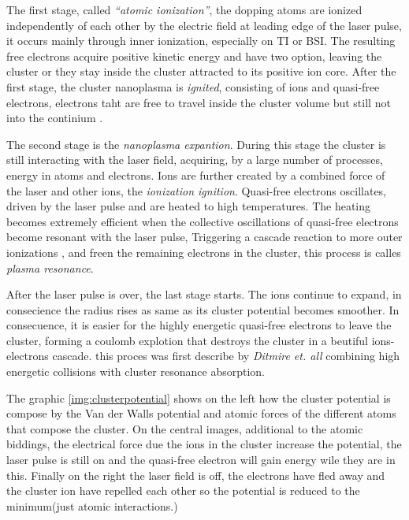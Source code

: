 The first stage, called \textit{“atomic ionization”}, the dopping atoms are ionized independently of each other by the electric field at leading edge of the laser pulse, it occurs mainly through inner ionization, especially on TI or BSI. The resulting free electrons acquire positive kinetic energy and have two option, leaving  the cluster or they stay inside the cluster attracted to its positive ion core. After the first stage, the cluster nanoplasma is \textit{ignited}, consisting of ions and quasi-free electrons, electrons taht are free to travel inside the cluster volume but still not into the continium \cite{last_quasiresonance_1999}. 


The second stage is the  \textit{nanoplasma expantion}. During this stage the cluster is still interacting with the laser field, acquiring, by a large number of processes, energy in atoms and electrons. Ions are further created by a combined force of the laser and other ions, the \textit{ionization ignition}\cite{gruner_femtosekundenspektroskopie_2013}. Quasi-free electrons oscillates, driven by the laser pulse and are heated to high temperatures. The heating becomes extremely efficient when the collective oscillations of quasi-free electrons become resonant with the laser pulse, Triggering a cascade reaction to more outer ionizations , and freen the remaining electrons in the cluster, this process is calles \textit{plasma resonance}\cite{saalmann_mechanisms_2006}.


After the laser pulse is over, the last stage starts. The ions continue to expand, in consecience the radius rises as same as its cluster potential becomes smoother. In consecuence, it is easier for the highly energetic quasi-free electrons to leave the cluster, forming a coulomb explotion that destroys the cluster in a beutiful ions-electrons cascade. this proces was first describe by \textit{Ditmire et. all} \cite{ditmire_interaction_1996} combining high energetic collisions with cluster resonance absorption.

The graphic \ref{img:clusterpotential} shows on the left how the cluster potential is compose by the Van der Walls potential and atomic forces of the different atoms that compose the cluster. On the central images, additional to the atomic biddings, the electrical force due the ions in the cluster increase the potential, the laser pulse is still on and the quasi-free electron will gain energy wile they are in this. Finally on the right the laser field is off, the electrons have fled away and the cluster ion have repelled each other so the potential is reduced to the minimum(just atomic interactions.)


